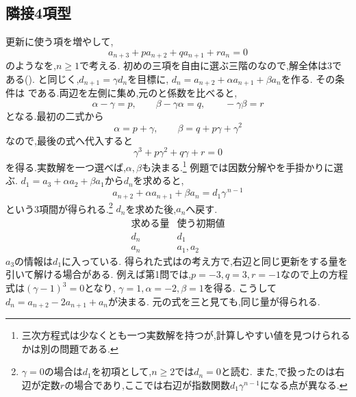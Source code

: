\subsection{隣接4項型}\label{節：隣接4項型}
更新に使う項を増やして,
\[
  a_{n+3}+pa_{n+2}+qa_{n+1}+ra_n=0
\]
のようなを,$n\ge1$で考える.
初めの三項を自由に選ぶ三階のなので,解全体は3である().
と同じく,$d_{n+1}=\gamma d_n$を目標に,
$d_n=a_{n+2}+\alpha a_{n+1}+\beta a_n$を作る.
その条件は
\BookMathLayout{\[
    a_{n+3}+\alpha a_{n+2}+\beta a_{n+1}=\gamma \left(a_{n+2}+\alpha a_{n+1}+\beta a_{n}\right)
  \]}{
  \[
    \begin{aligned}
      a_{n+3}+\alpha a_{n+2}+\beta a_{n+1}\\
      {}=\gamma\left(a_{n+2}+\alpha a_{n+1}+\beta a_n\right)
    \end{aligned}
  \]
}
である.両辺を左側に集め,元のと係数を比べると,
\[
  \alpha-\gamma=p,\qquad
  \beta-\gamma\alpha=q,\qquad
  -\gamma\beta=r
\]
となる.最初の二式から
\[
  \alpha=p+\gamma,\qquad
  \beta=q+p\gamma+\gamma^2
\]
なので,最後の式へ代入すると
\[
  \gamma^3+p\gamma^2+q\gamma+r=0
\]
を得る.実数解を一つ選べば,$\alpha,\beta$も決まる.\footnote{三次方程式は少なくとも一つ実数解を持つが,計算しやすい値を見つけられるかは別の問題である.}
例題では因数分解やを手掛かりに選ぶ.
$d_1=a_3+\alpha a_2+\beta a_1$から$d_n$を求めると,
\[
  a_{n+2}+\alpha a_{n+1}+\beta a_n=d_1\gamma^{\,n-1}
\]
という3項間が得られる.\footnote{$\gamma=0$の場合は$d_1$を初項として,$n\ge2$では$d_n=0$と読む.
  また,で扱ったのは右辺が定数$r$の場合であり,ここでは右辺が指数関数$d_1\gamma^{n-1}$になる点が異なる.}
$d_n$を求めた後,$a_n$へ戻す.
\[
  \begin{array}{c|c}
    \text{求める量}&\text{使う初期値}\\ \hline
    d_n&d_1\\
    a_n&a_1,a_2
  \end{array}
\]
$a_3$の情報は$d_1$に入っている.
得られた式はの考え方で,右辺と同じ更新をする量を引いて解ける場合がある.
例えば第1問では,$p=-3,q=3,r=-1$なので上の方程式は$(\gamma-1)^3=0$となり,
$\gamma=1,\alpha=-2,\beta=1$を得る.
こうして$d_n=a_{n+2}-2a_{n+1}+a_n$が決まる.
元の式を\mbox{三}と見ても,同じ量が得られる.


